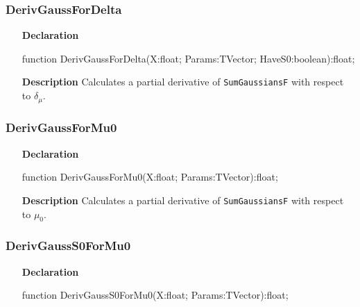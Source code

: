 \documentclass[12pt,a4paper,oneside]{report}
\newcommand{\declarationitem}[1]{\textbf{#1}}
\newcommand{\descriptiontitle}[1]{\textbf{#1}}
\newcommand{\code}[1]{\texttt{#1}}
\begin{document}
\subsubsection{DerivGaussForDelta}
\label{ugaussf-DerivGaussForDelta}
\begin{itemize}\item[\declarationitem{Declaration}\hfill]
	\begin{flushleft}
		\begin{ttfamily}
			function DerivGaussForDelta(X:float; Params:TVector; HaveS0:boolean):float;\end{ttfamily}
		
	\end{flushleft}
	
	\par
	\item[\descriptiontitle{Description}]
	Calculates a partial derivative of \code{SumGaussiansF} with respect to $\delta_{\mu}$.
	
\end{itemize}
\subsubsection{DerivGaussForMu0}
\label{ugaussf-DerivGaussForMu0}
\begin{itemize}\item[\declarationitem{Declaration}\hfill]
	\begin{flushleft}
		\begin{ttfamily}
			function DerivGaussForMu0(X:float; Params:TVector):float;\end{ttfamily}
		
	\end{flushleft}
	\par
	\item[\descriptiontitle{Description}]
	Calculates a partial derivative of \code{SumGaussiansF} with respect to $\mu_0$.
	
\end{itemize}
\subsubsection{DerivGaussS0ForMu0}
\label{ugaussf-DerivGaussS0ForMu0}
\begin{itemize}\item[\declarationitem{Declaration}\hfill]
	\begin{flushleft}
		\begin{ttfamily}
			function DerivGaussS0ForMu0(X:float; Params:TVector):float;\end{ttfamily}
		
	\end{flushleft}
	
\end{itemize}
\end{document}

